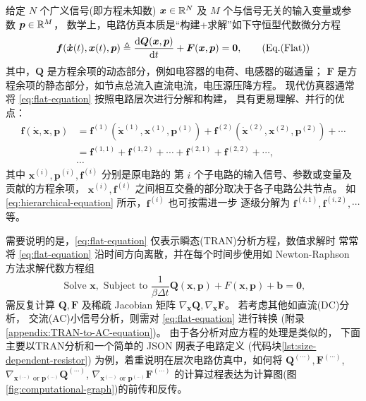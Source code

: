 给定 $N$ 个广义信号(即方程未知数) $\bm{x}\in\mathbb{R}^N$
及 $M$ 个与信号无关的输入变量或参数 $\bm{p}\in\mathbb{R}^M$，
数学上，电路仿真本质是“构建+求解”如下守恒型代数微分方程
\cite{najm2010circuit,gunther2005modelling,hu2020adjoint}
\begin{equation}\label{eq:flat-equation}
  \bm{f}(\bm{\dot{x}}(t),\bm{x}(t),\bm{p})
  \triangleq\frac{\mathrm{d}\bm{Q}(\bm{x},\bm{p})}{\mathrm{d} t}+\bm{F}(\bm{x},\bm{p})
  =\bm{0},\tag{Eq.(Flat)}
\end{equation}
其中，$\bm{Q}$ 是方程余项的动态部分，例如电容器的电荷、电感器的磁通量；
$\bm{F}$ 是方程余项的静态部分，如节点总流入直流电流，电压源压降方程。
现代仿真器通常将 \ref{eq:flat-equation} 按照电路层次进行分解和构建，
具有更易理解、并行的优点：
\begin{equation}\label{eq:hierarchical-equation}
  \begin{split}
    \bm{f}(\bm{\dot{x}},\bm{x},\bm{p})
    & = \bm{f}^{(1)}(\bm{\dot{x}}^{(1)},\bm{x}^{(1)},\bm{p}^{(1)})
    + \bm{f}^{(2)}(\bm{\dot{x}}^{(2)},\bm{x}^{(2)},\bm{p}^{(2)})
    + \cdots \\
    & = \bm{f}^{(1,1)}+\bm{f}^{(1,2)}+\cdots+\bm{f}^{(2,1)}+\bm{f}^{(2,2)}+\cdots, \\
    & \cdots
  \end{split}\tag{Eq.(Hierarchical)}
\end{equation}
其中 $\bm{x}^{(i)},\bm{p}^{(i)},\bm{f}^{(i)}$ 分别是原电路的
第 $i$ 个子电路的输入信号、参数或变量及贡献的方程余项，
$\bm{x}^{(i)},\bm{f}^{(i)}$ 之间相互交叠的部分取决于各子电路公共节点。
如 \ref{eq:hierarchical-equation} 所示，$\bm{f}^{(i)}$ 也可按需进一步
逐级分解为 $\bm{f}^{(i,1)},\bm{f}^{(i,2)},\cdots$ 等。

需要说明的是，\ref{eq:flat-equation} 仅表示瞬态(TRAN)分析方程，数值求解时
常常将 \ref{eq:flat-equation} 沿时间方向离散，并在每个时间步使用如 Newton-Raphson
方法求解代数方程组
\cite[Sec 7.1]{fijnvandraat2002time}
\[
  \text{ Solve }\bm{x},\text{ Subject to }
  \frac{1}{\beta\Delta t}\bm{Q}(\bm{x},\bm{p})+F(\bm{x},\bm{p})+\bm{b}=\bm{0},
\]
需反复计算 $\bm{Q},\bm{F}$ 及稀疏 Jacobian 矩阵
$\nabla_{\bm{x}}\bm{Q},\nabla_{\bm{x}}\bm{F}$。 若考虑其他如直流(DC)分析，
交流(AC)小信号分析，则需对 \ref{eq:flat-equation} 进行转换
(附录\ref{appendix:TRAN-to-AC-equation})。 由于各分析对应方程的处理是类似的，
下面主要以TRAN分析和一个简单的 JSON 网表子电路定义
(代码块\ref{lst:size-dependent-resistor})
为例，着重说明在层次电路仿真中，如何将
$\bm{Q}^{(\cdots)},\bm{F}^{(\cdots)}$,
$\nabla_{\bm{x}^{(\cdots)}\text{ or }\bm{p}^{(\cdots)}}\bm{Q}^{(\cdots)}$,
$\nabla_{\bm{x}^{(\cdots)}\text{ or }\bm{p}^{(\cdots)}}\bm{F}^{(\cdots)}$
的计算过程表达为计算图(图\ref{fig:computational-graph})的前传和反传。


